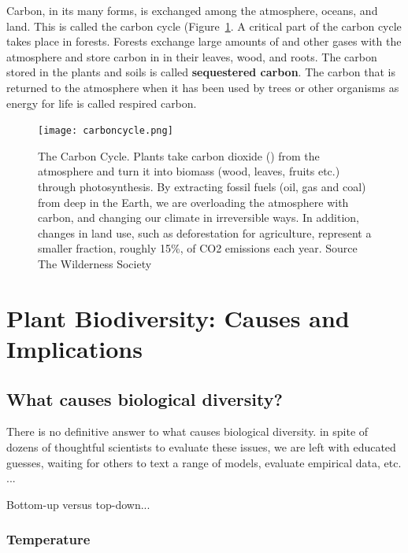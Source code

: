 Carbon, in its many forms, is exchanged among the atmosphere, oceans, and land. This is called the carbon cycle (Figure~\ref{fig:carboncycle}. A critical part of the carbon cycle takes place in forests. Forests exchange large amounts of \CO and other gases with the atmosphere and store carbon in in their leaves, wood, and roots. The carbon stored in the plants and soils is called \textbf{sequestered carbon}. The carbon that is returned to the atmosphere when it has been used by trees or other organisms as energy for life is called \gls{respired carbon}. 
  
 \begin{figure}[ht]
    \centering
		\caption{The Carbon Cycle. Plants take carbon dioxide (\CO) from the atmosphere and turn it into biomass (wood, leaves, fruits etc.) through photosynthesis. By extracting fossil fuels (oil, gas and coal) from deep in the Earth, we are overloading the atmosphere with carbon, and changing our climate in irreversible ways. In addition, changes in land use, such as deforestation for agriculture, represent a smaller fraction, roughly 15\%, of CO2 emissions each year. Source The Wilderness Society}
		\label{fig:carboncycle}
        \texttt{[image: carboncycle.png]}
\end{figure}

\section[Plant Biodiversity]{Plant Biodiversity: Causes and Implications}

\subsection{What causes biological diversity?}

There is no definitive answer to what causes biological diversity. in spite of dozens of thoughtful scientists to evaluate these issues, we are left with educated guesses, waiting for others to text a range of models, evaluate empirical data, etc. ...

Bottom-up versus top-down...

\subsubsection{Temperature}

